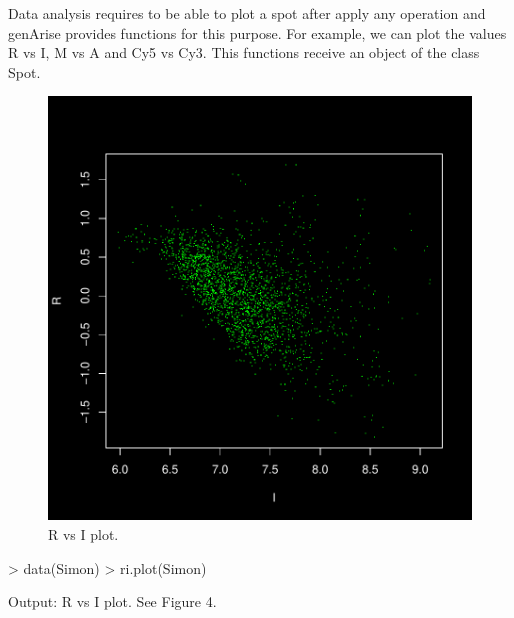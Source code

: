 \documentclass[12pt]{article}
\begin{document}
Data analysis requires to be able to plot a spot after apply any operation and genArise provides functions for this purpose. For example, we can plot the values R vs I, M vs A and Cy5 vs Cy3. This functions receive an object of the class Spot.
\begin{figure}[h]
\begin{center}
\includegraphics{example-genArise-006}
\caption{R vs I plot. \label{fig4}}	
\end{center}
\end{figure}
\begin{Scode}
> data(Simon)
> ri.plot(Simon)
\end{Scode}
\begin{Soutput}
Output: R vs I plot. See Figure 4.
\end{Soutput}
\end{document}

